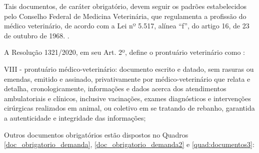 \documentclass[
    12pt,               %
    openright,          %
    oneside,
    a4paper,            %
    BIBLATEX,           %
    TODO,               %
    english,            %
    brazil              %
    ]{ifsp-spo-inf-ctds}
\begin{document}
        Tais documentos, de caráter obrigatório, devem seguir os padrões estabelecidos pelo Conselho Federal de Medicina Veterinária, que regulamenta a profissão do médico veterinário, de acordo com a Lei nº 5.517, alínea “f”, do artigo 16, de 23 de outubro de 1968. .

        A Resolução 1321/2020, em seu Art. 2º, define o prontuário veterinário como : 

        \begin{citacao}

        
            VIII - prontuário médico-veterinário: documento escrito e datado, sem rasuras ou emendas, emitido e assinado, privativamente por médico-veterinário que relata e detalha, cronologicamente, informações e dados acerca dos atendimentos ambulatoriais e clínicos, inclusive vacinações, exames diagnósticos e intervenções cirúrgicas realizados em animal, ou coletivo em se tratando de rebanho, garantida a autenticidade e integridade das informações;
        \end{citacao}

        Outros documentos obrigatórios estão dispostos no Quadros \ref{doc_obrigatorio_demanda}, \ref{doc_obrigatorio_demanda2} e \ref{quad:documentos3}: 
\end{document}
